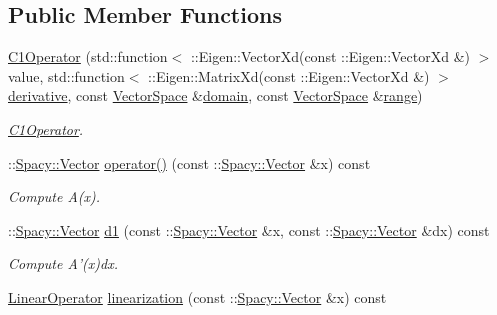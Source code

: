 \subsection*{\-Public \-Member \-Functions}
\begin{DoxyCompactItemize}
\item 
\hyperlink{classSpacy_1_1Rn_1_1C1Operator_ace713dafa8c7422f57f0f1c0a989db12}{\-C1\-Operator} (std\-::function$<$ \-::\-Eigen\-::\-Vector\-Xd(const \-::\-Eigen\-::\-Vector\-Xd \&) $>$ value, std\-::function$<$ \-::\-Eigen\-::\-Matrix\-Xd(const \-::\-Eigen\-::\-Vector\-Xd \&) $>$ \hyperlink{namespaceSpacy_a002fe344fa6d04a6ac59a74ea25fddb6}{derivative}, const \hyperlink{classSpacy_1_1VectorSpace}{\-Vector\-Space} \&\hyperlink{classSpacy_1_1OperatorBase_a2588f9b3e0188820c4c494e63293dc6f}{domain}, const \hyperlink{classSpacy_1_1VectorSpace}{\-Vector\-Space} \&\hyperlink{classSpacy_1_1OperatorBase_ab19d3b7a6f290b1079248f1e567e53d6}{range})
\begin{DoxyCompactList}\small\item\em \hyperlink{classSpacy_1_1Rn_1_1C1Operator}{\-C1\-Operator}. \end{DoxyCompactList}\item 
\hypertarget{classSpacy_1_1Rn_1_1C1Operator_a21205efc25688cb7d5f184eeb637df60}{\-::\hyperlink{classSpacy_1_1Vector}{\-Spacy\-::\-Vector} \hyperlink{classSpacy_1_1Rn_1_1C1Operator_a21205efc25688cb7d5f184eeb637df60}{operator()} (const \-::\hyperlink{classSpacy_1_1Vector}{\-Spacy\-::\-Vector} \&x) const }\label{classSpacy_1_1Rn_1_1C1Operator_a21205efc25688cb7d5f184eeb637df60}

\begin{DoxyCompactList}\small\item\em \-Compute \-A(x). \end{DoxyCompactList}\item 
\hypertarget{classSpacy_1_1Rn_1_1C1Operator_af15f1491a967262ffcfe6d484d440940}{\-::\hyperlink{classSpacy_1_1Vector}{\-Spacy\-::\-Vector} \hyperlink{classSpacy_1_1Rn_1_1C1Operator_af15f1491a967262ffcfe6d484d440940}{d1} (const \-::\hyperlink{classSpacy_1_1Vector}{\-Spacy\-::\-Vector} \&x, const \-::\hyperlink{classSpacy_1_1Vector}{\-Spacy\-::\-Vector} \&dx) const }\label{classSpacy_1_1Rn_1_1C1Operator_af15f1491a967262ffcfe6d484d440940}

\begin{DoxyCompactList}\small\item\em \-Compute \-A'(x)dx. \end{DoxyCompactList}\item 
\hypertarget{classSpacy_1_1Rn_1_1C1Operator_a507155c1dbf6f312cf4864b509ed84bc}{\hyperlink{classSpacy_1_1Rn_1_1LinearOperator}{\-Linear\-Operator} \hyperlink{classSpacy_1_1Rn_1_1C1Operator_a507155c1dbf6f312cf4864b509ed84bc}{linearization} (const \-::\hyperlink{classSpacy_1_1Vector}{\-Spacy\-::\-Vector} \&x) const }\label{classSpacy_1_1Rn_1_1C1Operator_a507155c1dbf6f312cf4864b509ed84bc}


\end{DoxyCompactItemize}
